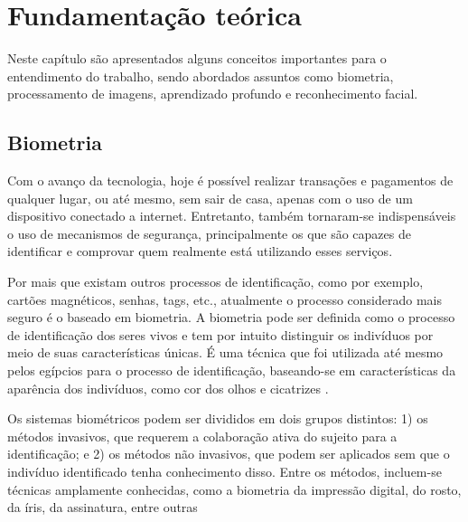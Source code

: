 \chapter{Fundamentação te\'orica}\label{cap:referencialTeorico}

Neste capítulo são apresentados alguns conceitos importantes para o entendimento
do trabalho, sendo abordados assuntos como biometria, processamento de imagens, aprendizado 
profundo e reconhecimento facial.

\section{Biometria}\label{sec:biometria}

Com o avanço da tecnologia, hoje é possível realizar transações e pagamentos 
de qualquer lugar, ou até mesmo, sem sair de casa, apenas com o uso de 
um dispositivo conectado a internet. Entretanto, também tornaram-se indispensáveis 
o uso de mecanismos de segurança, principalmente os que são capazes de identificar 
e comprovar quem realmente está utilizando esses serviços.

Por mais que existam outros processos de identificação, como por exemplo, cartões 
magnéticos, senhas, tags, etc., atualmente o processo considerado mais seguro é 
o baseado em biometria. A biometria pode ser definida como o processo de identificação 
dos seres vivos e tem por intuito distinguir os indivíduos por meio 
de suas características únicas. É uma técnica que foi utilizada até mesmo pelos egípcios 
para o processo de identificação, baseando-se em características da
aparência dos indivíduos, como cor dos olhos e cicatrizes \cite{santos2007}.

Os sistemas biométricos podem ser divididos em dois grupos distintos: 
1) os métodos invasivos, que requerem a colaboração ativa do sujeito 
para a identificação; e 2) os métodos não invasivos, que podem ser 
aplicados sem que o indivíduo identificado tenha conhecimento disso. 
Entre os métodos, incluem-se técnicas amplamente conhecidas, 
como a biometria da impressão digital, do rosto, da íris, da assinatura, 
entre outras \cite{teixeira2011}

